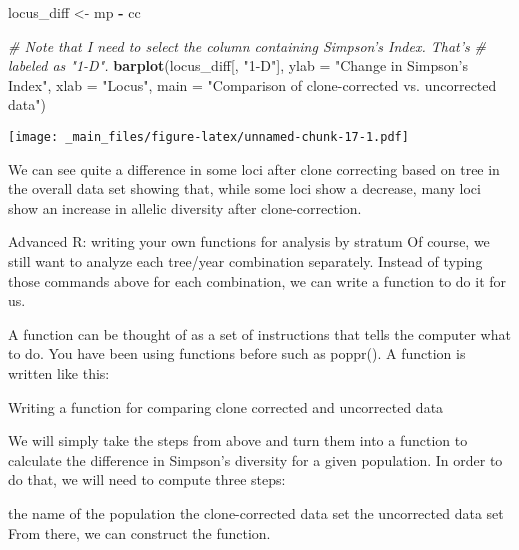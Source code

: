 \documentclass[12pt,]{krantz}
\newenvironment{Shaded}{\begin{snugshade}}{\end{snugshade}}
\newcommand{\KeywordTok}[1]{\textcolor[rgb]{0.27,0.27,0.27}{\textbf{#1}}}
\newcommand{\DataTypeTok}[1]{\textcolor[rgb]{0.27,0.27,0.27}{#1}}
\newcommand{\StringTok}[1]{\textcolor[rgb]{0.5,0.5,0.5}{#1}}
\newcommand{\CommentTok}[1]{\textcolor[rgb]{0.56,0.35,0.01}{\textit{#1}}}
\newcommand{\OperatorTok}[1]{\textcolor[rgb]{0.81,0.36,0.00}{\textbf{#1}}}
\newcommand{\NormalTok}[1]{#1}
\theoremstyle{definition}
\theoremstyle{definition}
\theoremstyle{definition}
\theoremstyle{remark}
\begin{document}
\begin{Shaded}
\begin{Highlighting}[]
\NormalTok{locus_diff <-}\StringTok{ }\NormalTok{mp }\OperatorTok{-}\StringTok{ }\NormalTok{cc}

\CommentTok{# Note that I need to select the column containing Simpson's Index. That's}
\CommentTok{# labeled as "1-D".}
\KeywordTok{barplot}\NormalTok{(locus_diff[, }\StringTok{"1-D"}\NormalTok{], }\DataTypeTok{ylab =} \StringTok{"Change in Simpson's Index"}\NormalTok{, }\DataTypeTok{xlab =} \StringTok{"Locus"}\NormalTok{,}
        \DataTypeTok{main =} \StringTok{"Comparison of clone-corrected vs. uncorrected data"}\NormalTok{)}
\end{Highlighting}
\end{Shaded}

\texttt{[image: \_main\_files/figure-latex/unnamed-chunk-17-1.pdf]}

We can see quite a difference in some loci after clone correcting based
on tree in the overall data set showing that, while some loci show a
decrease, many loci show an increase in allelic diversity after
clone-correction.

Advanced R: writing your own functions for analysis by stratum Of
course, we still want to analyze each tree/year combination separately.
Instead of typing those commands above for each combination, we can
write a function to do it for us.

A function can be thought of as a set of instructions that tells the
computer what to do. You have been using functions before such as
poppr(). A function is written like this:

Writing a function for comparing clone corrected and uncorrected data

We will simply take the steps from above and turn them into a function
to calculate the difference in Simpson's diversity for a given
population. In order to do that, we will need to compute three steps:

the name of the population the clone-corrected data set the uncorrected
data set From there, we can construct the function.
\end{document}
